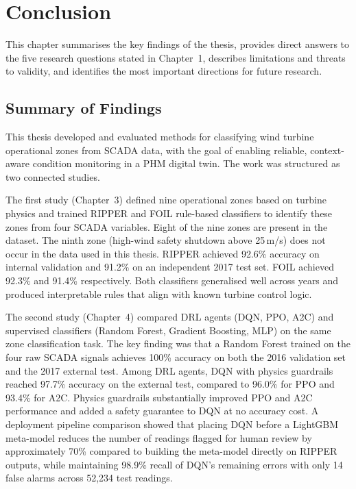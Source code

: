 \chapter{Conclusion}
\label{chap:conclusion}

This chapter summarises the key findings of the thesis, provides direct answers to the
five research questions stated in Chapter~1, describes limitations and threats to
validity, and identifies the most important directions for future research.

\section{Summary of Findings}
\label{sec:conc:summary}

This thesis developed and evaluated methods for classifying wind turbine operational
zones from SCADA data, with the goal of enabling reliable, context-aware condition
monitoring in a PHM digital twin. The work was structured as two connected studies.

The first study (Chapter~3) defined nine operational zones based on turbine physics and
trained RIPPER and FOIL rule-based classifiers to identify these zones from four SCADA
variables. Eight of the nine zones are present in the dataset. The ninth zone (high-wind
safety shutdown above 25\,m/s) does not occur in the data used in this thesis. RIPPER
achieved 92.6\%
accuracy on internal validation and 91.2\% on an independent 2017 test set. FOIL achieved
92.3\% and 91.4\% respectively. Both classifiers generalised well across years and
produced interpretable rules that align with known turbine control logic.

The second study (Chapter~4) compared DRL agents (DQN, PPO, A2C) and supervised
classifiers (Random Forest, Gradient Boosting, MLP) on the same zone classification
task. The key finding was that a Random Forest trained on the four raw SCADA signals
achieves 100\% accuracy on both the 2016 validation set and the 2017 external test. Among
DRL agents, DQN with physics guardrails reached 97.7\% accuracy on the external test,
compared to 96.0\% for PPO and 93.4\% for A2C. Physics guardrails substantially improved
PPO and A2C performance and added a safety guarantee to DQN at no accuracy cost. A
deployment pipeline comparison showed that placing DQN before a LightGBM meta-model
reduces the number of readings flagged for human review by approximately 70\% compared
to building the meta-model directly on RIPPER outputs, while maintaining 98.9\% recall
of DQN's remaining errors with only 14 false alarms across 52,234 test readings.

